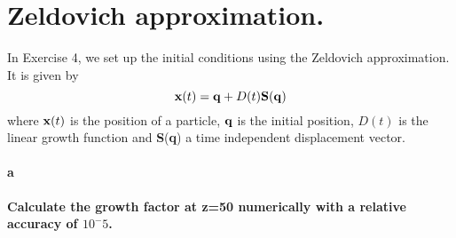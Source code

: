 \section{Zeldovich approximation.}
In Exercise 4, we set up the initial conditions using the Zeldovich approximation. It is given by
\begin{equation}
     {\bf x}(t) = {\bf q} + D(t) {\bf S}({\bf q})
\end{equation}
where ${\bf x}(t)$ is the position of a particle, ${\bf q} $ is the initial position, $D(t)$ is the linear growth function and {\bf S}({\bf q}) a time independent displacement vector. 


\paragraph{a} \textbf{Calculate the growth factor at z=50 numerically with a relative accuracy of $10^-5$.}


